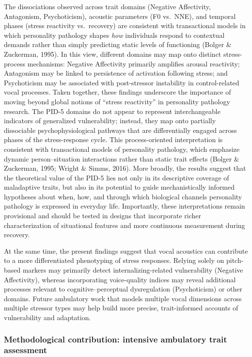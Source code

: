\documentclass[
  english,
  man]{apa6}
\begin{document}
The dissociations observed across trait domains (Negative Affectivity, Antagonism, Psychoticism), acoustic parameters (F0 vs.~NNE), and temporal phases (stress reactivity vs.~recovery) are consistent with transactional models in which personality pathology shapes \emph{how} individuals respond to contextual demands rather than simply predicting static levels of functioning (Bolger \& Zuckerman, 1995). In this view, different domains may map onto distinct stress-process mechanisms: Negative Affectivity primarily amplifies arousal reactivity; Antagonism may be linked to persistence of activation following stress; and Psychoticism may be associated with post-stressor instability in control-related vocal processes. Taken together, these findings underscore the importance of moving beyond global notions of ``stress reactivity'' in personality pathology research. The PID-5 domains do not appear to represent interchangeable indicators of generalized vulnerability; instead, they map onto partially dissociable psychophysiological pathways that are differentially engaged across phases of the stress-response cycle. This process-oriented interpretation is consistent with transactional models of personality pathology, which emphasize dynamic person--situation interactions rather than static trait effects (Bolger \& Zuckerman, 1995; Wright \& Simms, 2016). More broadly, the results suggest that the theoretical value of the PID-5 lies not only in its descriptive coverage of maladaptive traits, but also in its potential to guide mechanistically informed hypotheses about when, how, and through which biological channels personality pathology is expressed in everyday life. Importantly, these interpretations remain provisional and should be tested in designs that incorporate richer characterization of situational features and more continuous measurement during recovery.

At the same time, the present findings suggest that vocal acoustics can contribute to a more differentiated phenotyping of stress responses. Relying solely on pitch-based markers may primarily detect internalizing-related vulnerability (Negative Affectivity), whereas incorporating voice-quality indices may reveal additional processes relevant to cognitive--perceptual dysregulation (Psychoticism) or other domains. Future ambulatory work that models multiple vocal dimensions across multiple stressor types may help build more precise, trait-informed accounts of vulnerability and adaptation.

\subsubsection{Methodological contribution: intensive ambulatory trait assessment}\label{methodological-contribution-intensive-ambulatory-trait-assessment}
\end{document}

